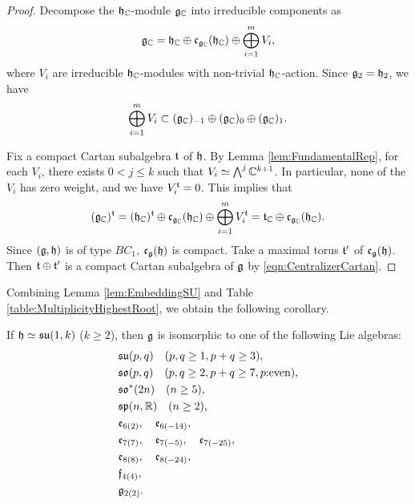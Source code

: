 \begin{proof}
	Decompose the $\mathfrak{h}_{\mathbb{C}}$-module $\mathfrak{g}_{\mathbb{C}}$ into irreducible components as
	\begin{align*}
		\mathfrak{g}_{\mathbb{C}} = \mathfrak{h}_{\mathbb{C}} \oplus \mathfrak{c}_{\mathfrak{g}_{\mathbb{C}}}(\mathfrak{h}_{\mathbb{C}}) \oplus \bigoplus_{i=1}^m V_i,
	\end{align*}
	where $V_i$ are irreducible $\mathfrak{h}_{\mathbb{C}}$-modules with non-trivial $\mathfrak{h}_{\mathbb{C}}$-action.
	Since $\mathfrak{g}_2 = \mathfrak{h}_2$, we have 
	\begin{align*}
		\bigoplus_{i=1}^m V_i \subset (\mathfrak{g}_{\mathbb{C}})_{-1} \oplus (\mathfrak{g}_{\mathbb{C}})_0 \oplus (\mathfrak{g}_{\mathbb{C}})_1.
	\end{align*}

	Fix a compact Cartan subalgebra $\mathfrak{t}$ of $\mathfrak{h}$.
	By Lemma \ref{lem:FundamentalRep}, for each $V_i$, there exists $0 < j \leq k$ such that $V_i \simeq \bigwedge\nolimits^j \mathbb{C}^{k+1}$.
	In particular, none of the $V_i$ has zero weight, and we have $V_i^{\mathfrak{t}} = 0$.
	This implies that
	\begin{align}
		(\mathfrak{g}_{\mathbb{C}})^{\mathfrak{t}} = (\mathfrak{h}_{\mathbb{C}})^{\mathfrak{t}} \oplus \mathfrak{c}_{\mathfrak{g}_{\mathbb{C}}}(\mathfrak{h}_{\mathbb{C}}) \oplus \bigoplus_{i=1}^m V_i^{\mathfrak{t}} = \mathfrak{t}_{\mathbb{C}} \oplus \mathfrak{c}_{\mathfrak{g}_{\mathbb{C}}}(\mathfrak{h}_{\mathbb{C}}). \label{eqn:CentralizerCartan}
	\end{align}
	Since $(\mathfrak{g}, \mathfrak{h})$ is of type $BC_1$, $\mathfrak{c}_{\mathfrak{g}}(\mathfrak{h})$ is compact.
	Take a maximal torus $\mathfrak{t'}$ of $\mathfrak{c}_{\mathfrak{g}}(\mathfrak{h})$.
	Then $\mathfrak{t}\oplus \mathfrak{t'}$ is a compact Cartan subalgebra of $\mathfrak{g}$ by \eqref{eqn:CentralizerCartan}.
\end{proof}

Combining Lemma \ref{lem:EmbeddingSU} and Table \ref{table:MultiplicityHighestRoot}, we obtain the following corollary.

\begin{corollary} \label{cor:EmbeddingSU}
	If $\mathfrak{h} \simeq \mathfrak{su}(1, k)$ ($k \geq 2$), then $\mathfrak{g}$ is isomorphic to one of the following Lie algebras:
	\begin{align*}
		&\mathfrak{su}(p, q) \quad (p, q \geq 1, p+q\geq 3), \\
		&\mathfrak{so}(p, q) \quad (p, q \geq 2, p+q\geq 7, p\text{:even}), \\
		&\mathfrak{so}^*(2n) \quad (n \geq 5), \\
		&\mathfrak{sp}(n,\mathbb{R}) \quad (n \geq 2), \\
		&\mathfrak{e}_{6(2)}, \quad \mathfrak{e}_{6(-14)}, \\
		&\mathfrak{e}_{7(7)}, \quad \mathfrak{e}_{7(-5)}, \quad \mathfrak{e}_{7(-25)}, \\
		&\mathfrak{e}_{8(8)}, \quad \mathfrak{e}_{8(-24)}, \\
		&\mathfrak{f}_{4(4)}, \\
		&\mathfrak{g}_{2(2)}.
	\end{align*}
\end{corollary}

